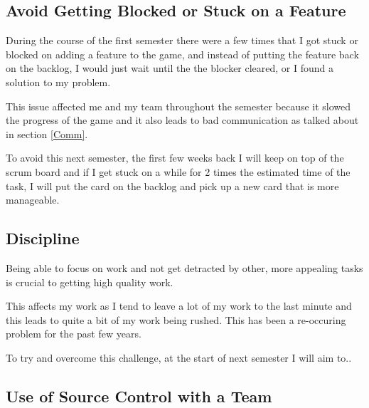 \documentclass{scrartcl}
\begin{document}
\subsection{Avoid Getting Blocked or Stuck on a Feature} \label{Avoid}

During the course of the first semester there were a few times that I got stuck or blocked on adding a feature to the game, and instead of putting the feature back on the backlog, I would just wait until the the blocker cleared, or I found a solution to my problem.



This issue affected me and my team throughout the semester because it slowed the progress of the game and it also leads to bad communication as talked about in section \ref{Comm}.


To avoid this next semester, the first few weeks back I will keep on top of the scrum board and if I get stuck on a while for 2 times the estimated time of the task, I will put the card on the backlog and pick up a new card that is more manageable.

\par






\subsection{Discipline} %

Being able to focus on work and not get detracted by other, more appealing tasks is crucial to getting high quality work.

This affects my work as I tend to leave a lot of my work to the last minute and this leads to quite a bit of my work being rushed.  
This has been a re-occuring problem for the past few years.

To try and overcome this challenge, at the start of next semester I will aim to.. %

\par




\subsection{Use of Source Control with a Team}
\end{document}
